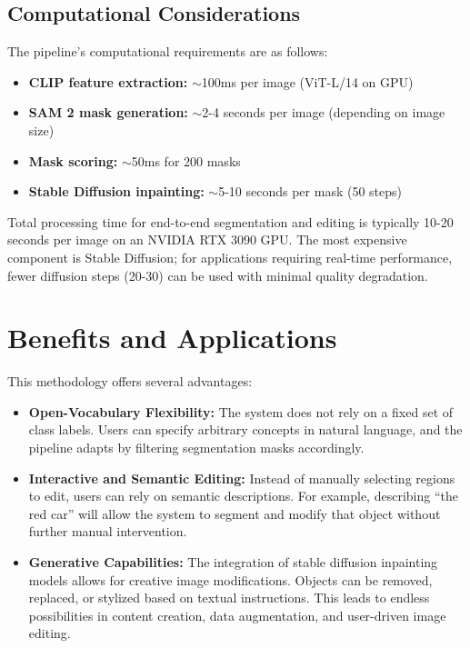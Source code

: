 \subsection{Computational Considerations}

The pipeline's computational requirements are as follows:
\begin{itemize}
    \item \textbf{CLIP feature extraction:} $\sim$100ms per image (ViT-L/14 on GPU)
    \item \textbf{SAM 2 mask generation:} $\sim$2-4 seconds per image (depending on image size)
    \item \textbf{Mask scoring:} $\sim$50ms for 200 masks
    \item \textbf{Stable Diffusion inpainting:} $\sim$5-10 seconds per mask (50 steps)
\end{itemize}

Total processing time for end-to-end segmentation and editing is typically 10-20 seconds per image on an NVIDIA RTX 3090 GPU. The most expensive component is Stable Diffusion; for applications requiring real-time performance, fewer diffusion steps (20-30) can be used with minimal quality degradation.

\section{Benefits and Applications}
This methodology offers several advantages:
\begin{itemize}
    \item \textbf{Open-Vocabulary Flexibility:}  
    The system does not rely on a fixed set of class labels. Users can specify arbitrary concepts in natural language, and the pipeline adapts by filtering segmentation masks accordingly.

    \item \textbf{Interactive and Semantic Editing:}  
    Instead of manually selecting regions to edit, users can rely on semantic descriptions. For example, describing “the red car” will allow the system to segment and modify that object without further manual intervention.

    \item \textbf{Generative Capabilities:}  
    The integration of stable diffusion inpainting models allows for creative image modifications. Objects can be removed, replaced, or stylized based on textual instructions. This leads to endless possibilities in content creation, data augmentation, and user-driven image editing.
\end{itemize}

